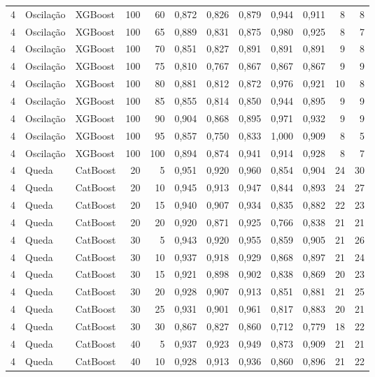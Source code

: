 \begin{longtable}{@{}rllrrrrrrrrr@{}}
4 & Oscilação & XGBoost & 100 & 60 & 0,872 & 0,826 & 0,879 & 0,944 & 0,911 & 8 & 8 \\
4 & Oscilação & XGBoost & 100 & 65 & 0,889 & 0,831 & 0,875 & 0,980 & 0,925 & 8 & 7 \\
4 & Oscilação & XGBoost & 100 & 70 & 0,851 & 0,827 & 0,891 & 0,891 & 0,891 & 9 & 8 \\
4 & Oscilação & XGBoost & 100 & 75 & 0,810 & 0,767 & 0,867 & 0,867 & 0,867 & 9 & 9 \\
4 & Oscilação & XGBoost & 100 & 80 & 0,881 & 0,812 & 0,872 & 0,976 & 0,921 & 10 & 8 \\
4 & Oscilação & XGBoost & 100 & 85 & 0,855 & 0,814 & 0,850 & 0,944 & 0,895 & 9 & 9 \\
4 & Oscilação & XGBoost & 100 & 90 & 0,904 & 0,868 & 0,895 & 0,971 & 0,932 & 9 & 9 \\
4 & Oscilação & XGBoost & 100 & 95 & 0,857 & 0,750 & 0,833 & 1,000 & 0,909 & 8 & 5 \\
4 & Oscilação & XGBoost & 100 & 100 & 0,894 & 0,874 & 0,941 & 0,914 & 0,928 & 8 & 7 \\
4 & Queda & CatBoost & 20 & 5 & 0,951 & 0,920 & 0,960 & 0,854 & 0,904 & 24 & 30 \\
4 & Queda & CatBoost & 20 & 10 & 0,945 & 0,913 & 0,947 & 0,844 & 0,893 & 24 & 27 \\
4 & Queda & CatBoost & 20 & 15 & 0,940 & 0,907 & 0,934 & 0,835 & 0,882 & 22 & 23 \\
4 & Queda & CatBoost & 20 & 20 & 0,920 & 0,871 & 0,925 & 0,766 & 0,838 & 21 & 21 \\
4 & Queda & CatBoost & 30 & 5 & 0,943 & 0,920 & 0,955 & 0,859 & 0,905 & 21 & 26 \\
4 & Queda & CatBoost & 30 & 10 & 0,937 & 0,918 & 0,929 & 0,868 & 0,897 & 21 & 24 \\
4 & Queda & CatBoost & 30 & 15 & 0,921 & 0,898 & 0,902 & 0,838 & 0,869 & 20 & 23 \\
4 & Queda & CatBoost & 30 & 20 & 0,928 & 0,907 & 0,913 & 0,851 & 0,881 & 21 & 25 \\
4 & Queda & CatBoost & 30 & 25 & 0,931 & 0,901 & 0,961 & 0,817 & 0,883 & 20 & 21 \\
4 & Queda & CatBoost & 30 & 30 & 0,867 & 0,827 & 0,860 & 0,712 & 0,779 & 18 & 22 \\
4 & Queda & CatBoost & 40 & 5 & 0,937 & 0,923 & 0,949 & 0,873 & 0,909 & 21 & 21 \\
4 & Queda & CatBoost & 40 & 10 & 0,928 & 0,913 & 0,936 & 0,860 & 0,896 & 21 & 22 \\

\end{longtable}
